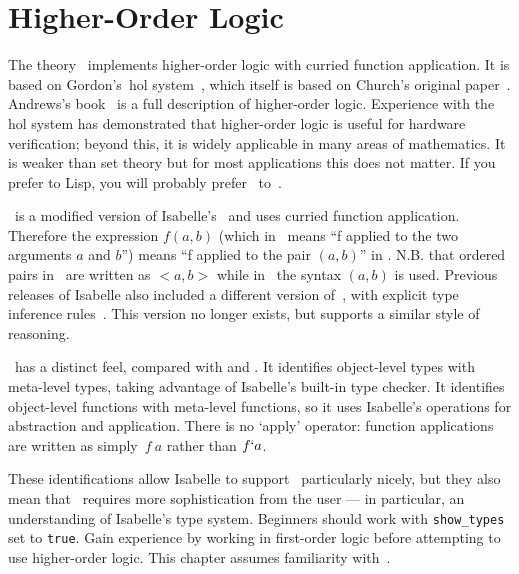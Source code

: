 \chapter{Higher-Order Logic}

The theory~ implements higher-order logic with curried
function application.  It is based on Gordon's~{\sc hol}
system~\cite{mgordon-hol}, which itself is based on Church's original
paper~\cite{church40}.  Andrews's book~\cite{andrews86} is a full
description of higher-order logic.  Experience with the {\sc hol}
system has demonstrated that higher-order logic is useful for hardware
verification; beyond this, it is widely applicable in many areas of
mathematics.  It is weaker than {\ZF} set theory but for most
applications this does not matter.  If you prefer {\ML} to Lisp, you
will probably prefer \CHOL\ to~{\ZF}.

\CHOL\ is a modified version of Isabelle's \HOL\ and uses curried function
application. Therefore the expression $f(a,b)$ (which in \HOL\ means
``f applied to the two arguments $a$ and $b$'') means ``f applied to
the pair $(a,b)$'' in \CHOL. N.B. that ordered pairs in \HOL\ are written as
$<a,b>$ while in \CHOL\ the syntax $(a,b)$ is used.  Previous
releases of Isabelle also included a different version of~\HOL, with
explicit type inference rules~\cite{paulson-COLOG}.  This version no
longer exists, but  supports a similar style of reasoning.

\CHOL\ has a distinct feel, compared with {\ZF} and {\CTT}.  It
identifies object-level types with meta-level types, taking advantage of
Isabelle's built-in type checker.  It identifies object-level functions
with meta-level functions, so it uses Isabelle's operations for abstraction
and application.  There is no `apply' operator: function applications are
written as simply~$f~a$ rather than $f{\tt`}a$.

These identifications allow Isabelle to support \CHOL\ particularly nicely,
but they also mean that \CHOL\ requires more sophistication from the user
--- in particular, an understanding of Isabelle's type system.  Beginners
should work with {\tt show_types} set to {\tt true}.  Gain experience by
working in first-order logic before attempting to use higher-order logic.
This chapter assumes familiarity with~{\FOL{}}.


